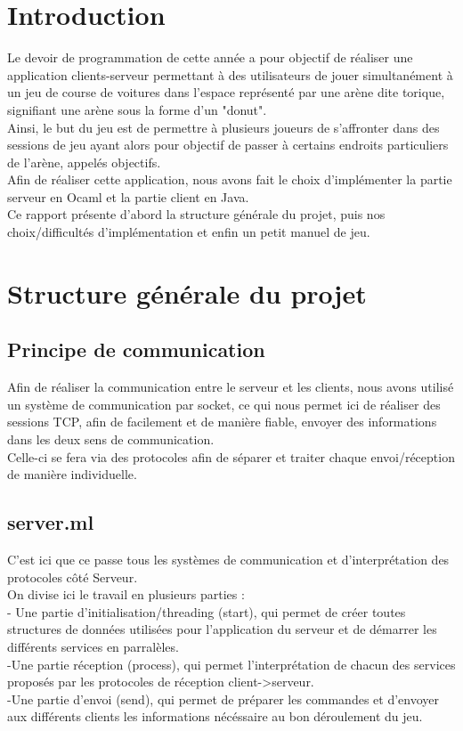 \documentclass[11pt]{article}
\begin{document}
\tableofcontents
\newpage

\setlength\parindent{0pt}
\section{Introduction}

Le devoir de programmation de cette année a pour objectif de réaliser une application clients-serveur permettant à des utilisateurs de jouer simultanément à un jeu de course de voitures dans l'espace représenté par une arène dite torique, signifiant une arène sous la forme d'un "donut".\\
 Ainsi, le but du jeu est de permettre à plusieurs joueurs de s'affronter dans des sessions de jeu ayant alors pour objectif de passer à certains endroits particuliers de l'arène, appelés objectifs.\\
Afin de réaliser cette application, nous avons fait le choix d'implémenter la partie serveur en Ocaml et la partie client en Java.\\
Ce rapport présente d'abord la structure générale du projet, puis nos choix/difficultés d'implémentation et enfin un petit manuel de jeu.

\section{Structure générale du projet}
\subsection{Principe de communication}
Afin de réaliser la communication entre le serveur et les clients, nous avons utilisé un système de communication par socket, ce qui nous permet ici de réaliser des sessions TCP, afin de facilement et de manière fiable, envoyer des informations dans les deux sens de communication.\\
Celle-ci se fera via des protocoles afin de séparer et traiter chaque envoi/réception de manière individuelle.

\subsection{server.ml}
C'est ici que ce passe tous les systèmes de communication et d'interprétation des protocoles côté Serveur.\\
On divise ici le travail en plusieurs parties : \\
- Une partie d'initialisation/threading (start), qui permet de créer toutes structures de données utilisées pour l'application du serveur et de démarrer les différents services en parralèles.\\
-Une partie réception (process), qui permet l'interprétation de chacun des services proposés par les protocoles de réception client->serveur.\\
-Une partie d'envoi (send), qui permet de préparer les commandes et d'envoyer aux différents clients les informations nécéssaire au bon déroulement du jeu.
\end{document}
